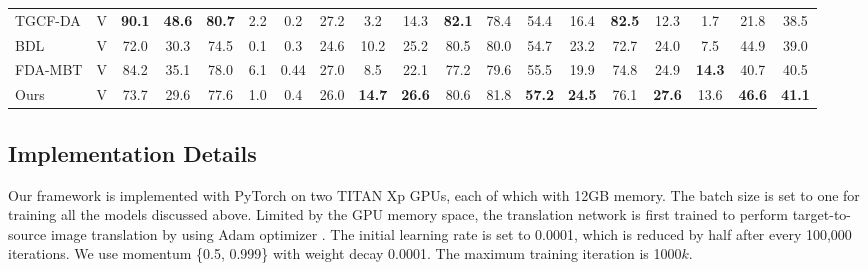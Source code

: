 \documentclass[runningheads]{llncs}
\begin{document}
\begin{table*}[t]
\begin{center}
\begin{tabular}{ @{} l|c|*{16}{c}|*{1}{c} @{} }
				TGCF-DA \cite{Choi2019self} & V &
				\bf90.1 & \bf48.6 & \bf80.7 & 2.2 & 0.2 & 27.2 & 3.2 & 14.3 & \bf82.1 & 78.4 & 54.4 & 16.4 & \bf82.5 & 12.3 & 1.7 & 21.8 & 38.5 \\
				
				BDL \cite{li2019bidirectional} & V &
				72.0 & 30.3 & 74.5 & 0.1 & 0.3 & 24.6 & 10.2 & 25.2 & 80.5 & 80.0 &
				54.7 & 23.2 & 72.7 & 24.0 & 7.5 & 44.9 & 39.0 \\
				
				FDA-MBT \cite{yang2020fda} & V &
				84.2 & 35.1 & 78.0 & 6.1 & 0.44 & 27.0 & 8.5 & 
				22.1 & 77.2 & 79.6 & 55.5 & 19.9 & 74.8 & 24.9 & 
				\bf 14.3 & 40.7 & 40.5 \\
				
				\midrule
				Ours & V &
				73.7&29.6&77.6&1.0&0.4&26.0&\bf14.7&\bf26.6&80.6&81.8&\bf57.2&\bf24.5&76.1&\bf27.6&13.6&\bf46.6&
				\bf41.1 \\
				
				\bottomrule
			\end{tabular}
		\end{center}
\end{table*}
	
	\subsection{Implementation Details}
	Our framework is implemented with PyTorch \cite{paszke2017automatic} on two TITAN Xp GPUs, each of which with 12GB memory. The batch size is set to one for training all the models discussed above. Limited by the GPU memory space, the translation network is first trained to perform target-to-source image translation by using Adam optimizer \cite{kingma2014adam}. The initial learning rate is set to 0.0001, which is reduced by half after every 100,000 iterations. We use momentum \{0.5, 0.999\} with weight decay 0.0001. The maximum training iteration is 1000$ k $. 
	
\end{document}
